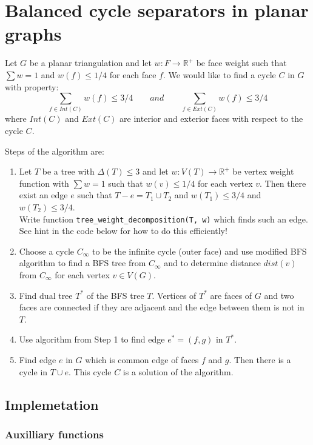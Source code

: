 \chapter{Balanced cycle separators in planar graphs}

Let $G$ be a planar triangulation and let $w: F \to \mathbb{R}^+$ be face weight such that $\sum w = 1$ and $w(f) \leq 1/4$ for each face $f$. We would like to find a cycle $C$ in $G$ with property:
$$
\sum_{f \in Int(C)} w(f) \leq 3/4\qquad and \qquad \sum_{f\in Ext(C)} w(f) \leq 3/4
$$
where $Int(C)$ and $Ext(C)$ are interior and exterior faces with respect to the cycle $C$.

\medskip
\noindent Steps of the algorithm are:
\begin{enumerate}
\item Let $T$ be a tree with $\Delta(T) \leq 3$ and let $w: V(T) \to \mathbb{R}^+$ be vertex weight function with $\sum w = 1$ such that $w(v) \leq 1/4$ for each vertex $v$. Then there exist an edge $e$ such that $T - e = T_1 \cup T_2$ and $w(T_1) \leq 3/4$ and $w(T_2) \leq 3/4$. \\
Write function \verb`tree_weight_decomposition(T, w)` which finds such an edge. See hint in the code below for how to do this efficiently!

\item Choose a cycle $C_\infty$ to be the infinite cycle (outer face) and use modified BFS algorithm to find a BFS tree from $C_\infty$ and to determine distance $dist(v)$ from $C_\infty$ for each vertex $v \in V(G)$.

\item Find dual tree $T^*$ of the BFS tree $T$. Vertices of $T^*$ are faces of $G$ and two faces are connected if they are adjacent and the edge between them is not in $T$.

\item Use algorithm from Step 1 to find edge $e^* = (f, g)$ in $T^*$.

\item Find edge $e$ in $G$ which is common edge of faces $f$ and $g$. Then there is a cycle in $T \cup e$. This cycle $C$ is a solution of the algorithm.
\end{enumerate}

\section{Implemetation}

\subsection*{Auxilliary functions}

